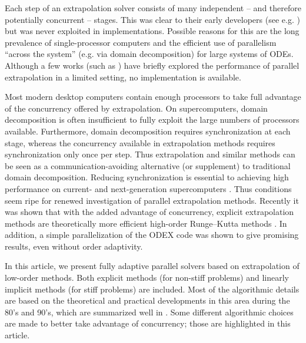 \documentclass[12pt]{article}
\begin{document}
Each step of an extrapolation solver consists
of many independent -- and therefore potentially concurrent --
stages.  This was clear to their early developers 
(see e.g. \cite{Deuflhard1985}) but was never exploited
in implementations.  Possible reasons for this are
the long prevalence of single-processor computers
and the efficient use of parallelism ``across the system''
(e.g. via domain decomposition) for large systems of ODEs.
Although a few works (such as \cite{Korch2011}) have briefly explored the performance of
parallel extrapolation in a limited setting, no
implementation is available.

Most modern desktop computers contain enough
processors to take full advantage of the concurrency offered by extrapolation.
On supercomputers, domain decomposition is often insufficient
to fully exploit the large numbers of processors available.  Furthermore, domain decomposition
requires synchronization at each stage, whereas the concurrency
available in extrapolation methods requires synchronization
only once per step.  Thus extrapolation and similar methods
can be seen as a communication-avoiding alternative (or supplement)
to traditional domain decomposition.  Reducing synchronization
is essential to achieving high performance on current- and
next-generation supercomputers \cite{rude2016research}.
Thus conditions seem ripe for 
renewed investigation of parallel extrapolation methods.
Recently it was shown that with the added
advantage of concurrency, explicit extrapolation methods 
are theoretically more
efficient high-order Runge--Kutta methods \cite{2014_hork}.
In addition, a simple parallelization of the ODEX code
was shown to give promising results, even without
order adaptivity.

In this article, we present fully adaptive parallel
solvers based on extrapolation of low-order
methods.  Both explicit methods (for non-stiff problems)
and linearly implicit methods (for stiff problems) are included.
Most of the algorithmic details are based on
the theoretical and practical developments
in this area during the 80's and 90's, which are
summarized well in \cite{hairer1993,Hairer:ODEs2}.
Some different algorithmic choices are made to better
take advantage of concurrency;
those are highlighted in this article.
\end{document}
